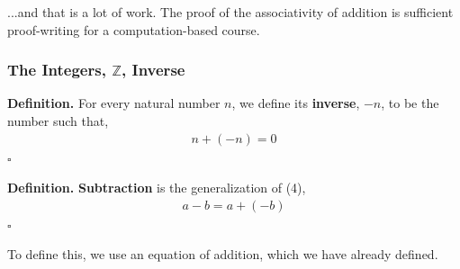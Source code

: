 \documentclass[letterpaper,twoside]{article}
\def\SmallHSpace{\hspace*{1mm}}
\newcommand{\DefinedTerm}[1]{\textbf{#1}}
\newcommand{\Definition}[1]{%
    \emoji{book} \textbf{Definition.}\SmallHSpace #1 \hfill $\square$
}
\newcommand{\Proof}[1]{%
    \emoji{brain} \textbf{Proof.}\SmallHSpace #1 \hfill $\square$
}
\newcommand{\Lemma}[1]{%
    \emoji{thinking-face} \textbf{Lemma.}\SmallHSpace #1 \hfill $\square$
}
\begin{document}
\begin{multicols}{2}
...and that is a lot of work.
The proof of the associativity of addition is sufficient proof-writing for a computation-based course.






\subsubsection{The Integers, $\mathbb{Z}$, Inverse}

\Definition
{
    For every natural number $n$, we define its \DefinedTerm{inverse}, $-n$, to be the number such that,
    \begin{align}
        n + (-n) = 0
    \end{align}
}

\Definition
{
    \DefinedTerm{Subtraction} is the generalization of (4),
    \begin{align}
        a - b = a + (-b)
    \end{align}
}

To define this, we use an equation of addition, which we have already defined.


\end{multicols}
\end{document}
